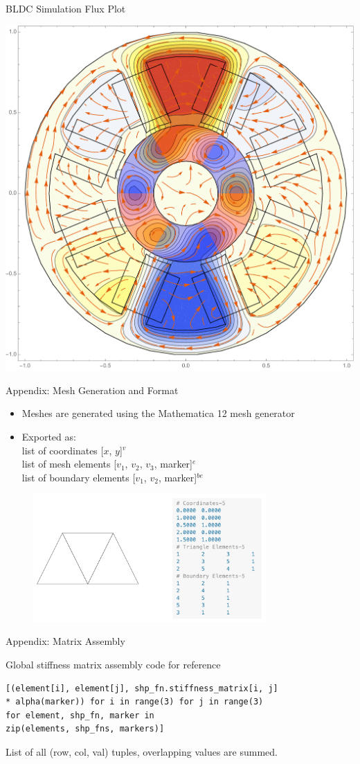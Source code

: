 \documentclass{beamer}
\begin{document}
    \begin{frame}{BLDC Simulation}
        Flux Plot
        \begin{center}
            \includegraphics[width=.6\linewidth]{motor1.pdf}
        \end{center}
    \end{frame}
    \begin{frame}{Appendix: Mesh Generation and Format}
        \begin{itemize}
            \item Meshes are generated using the Mathematica 12 mesh generator
            \item Exported as:\\ list of coordinates [$x$, $y$]$^v$ \\list of mesh elements [$v_1$, $v_2$, $v_3$, marker]$^{e}$ \\list of boundary elements [$v_1$, $v_2$, marker]$^{be}$
        \end{itemize}


        \begin{figure}
            \centering
            \includegraphics[width=3.5in]{meshdemo.png}
        \end{figure}
    \end{frame}
    \begin{frame}[fragile]{Appendix: Matrix Assembly}

        Global stiffness matrix assembly code for reference
        {\small
        \begin{verbatim}
[(element[i], element[j], shp_fn.stiffness_matrix[i, j]
* alpha(marker)) for i in range(3) for j in range(3)
for element, shp_fn, marker in
zip(elements, shp_fns, markers)]
        \end{verbatim}}
        List of all (row, col, val) tuples, overlapping values are summed.
    \end{frame}
\end{document}
